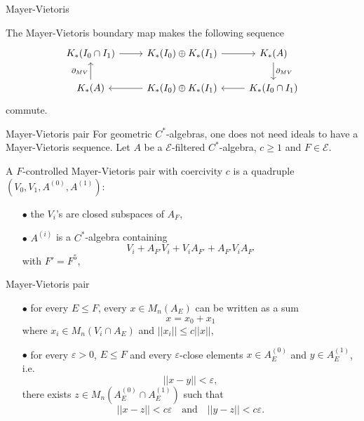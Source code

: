 \begin{frame}{Mayer-Vietoris}
\begin{thmfr}[Folklore]
The Mayer-Vietoris boundary map makes the following sequence 
\[\begin{tikzcd}[ampersand replacement=\&]
 K_*( I_0\cap I_1) \arrow{r} \& K_*(I_0) \oplus K_*(I_1) \arrow{r} \& K_*(A) \arrow{d}{\partial_{MV}} \\ 
K_*(A) \arrow{u}{\partial_{MV}} \& K_*(I_0) \oplus  K_*(I_1) \arrow{l} \& K_*( I_0 \cap I_1) \arrow{l}
\end{tikzcd}\] 
commute.
\end{thmfr}
\end{frame}

\begin{frame}{Mayer-Vietoris pair}
For geometric $C^*$-algebras, one does not need ideals to have a Mayer-Vietoris sequence.
Let $A$ be a $\mathcal E$-filtered $C^*$-algebra, $c\geq 1$ and $F\in \mathcal E$.
\begin{definition}
 A $F$-controlled Mayer-Vietoris pair with coercivity $c$ is a quadruple $(V_0, V_1, A^{(0)}, A^{(1)})$:
\begin{itemize}
\item[$\bullet$] the $V_i$'s are closed subspaces of $A_F$,
\item[$\bullet$] $A^{(i)}$ is a $C^*$-algebra containing \[ V_i + A_{F'} V_i + V_i A_{F'}  + A_{F'} V_i A_{F'}\]
with $F' = F^5$,
\end{itemize}
\end{definition}
\end{frame}

\begin{frame}{Mayer-Vietoris pair}
\begin{definition}
\begin{itemize}
\item[$\bullet$] for every $E\leq F$, every $x\in M_n(A_E)$ can be written as a sum \[x=x_0+x_1\] where $x_i\in M_n(V_i \cap A_E)$ and $|| x_i|| \leq c||x||$,
\item[$\bullet$] for every $\varepsilon>0$, $E\leq F$ and every $\varepsilon$-close elements $x\in A_E^{(0)}$ and $y\in A_E^{(1)}$, i.e.
\[|| x-y || < \varepsilon,\]
there exists $z\in M_n( A_E^{(0)}\cap A_E^{(1)})$ such that \[ ||x-z|| < c\varepsilon \quad \text{and} \quad ||y-z|| < c\varepsilon .\]
\end{itemize}
\end{definition}
\end{frame}

